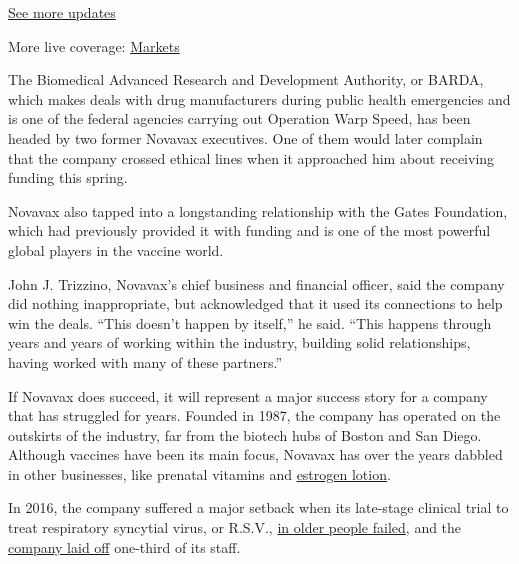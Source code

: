 \href{https://www.nytimes3xbfgragh.onion/2020/08/21/world/covid-19-coronavirus.html?action=click\&pgtype=Article\&state=default\&region=MAIN_CONTENT_1\&context=storylines_live_updates}{See
more updates}

More live coverage:
\href{https://www.nytimes3xbfgragh.onion/live/2020/08/20/business/stock-market-today-coronavirus?action=click\&pgtype=Article\&state=default\&region=MAIN_CONTENT_1\&context=storylines_live_updates}{Markets}

The Biomedical Advanced Research and Development Authority, or BARDA,
which makes deals with drug manufacturers during public health
emergencies and is one of the federal agencies carrying out Operation
Warp Speed, has been headed by two former Novavax executives. One of
them would later complain that the company crossed ethical lines when it
approached him about receiving funding this spring.

Novavax also tapped into a longstanding relationship with the Gates
Foundation, which had previously provided it with funding and is one of
the most powerful global players in the vaccine world.

John J. Trizzino, Novavax's chief business and financial officer, said
the company did nothing inappropriate, but acknowledged that it used its
connections to help win the deals. ``This doesn't happen by itself,'' he
said. ``This happens through years and years of working within the
industry, building solid relationships, having worked with many of these
partners.''

If Novavax does succeed, it will represent a major success story for a
company that has struggled for years. Founded in 1987, the company has
operated on the outskirts of the industry, far from the biotech hubs of
Boston and San Diego. Although vaccines have been its main focus,
Novavax has over the years dabbled in other businesses, like prenatal
vitamins and
\href{https://www.washingtonpost.com/archive/business/2003/10/11/novavaxs-estrogen-lotion-is-approved/53bc53d2-de8e-4c95-a1f0-8b05b3bcd6d0/}{estrogen
lotion}.

In 2016, the company suffered a major setback when its late-stage
clinical trial to treat respiratory syncytial virus, or R.S.V.,
\href{https://ir.novavax.com/news-releases/news-release-details/novavax-announces-topline-rsv-f-vaccine-data-two-clinical-trials}{in
older people failed}, and the
\href{https://endpts.com/crushed-by-a-phiii-flop-novavax-slashes-jobs-as-it-looks-to-chop-out-up-to-100m-in-costs/}{company
laid off} one-third of its staff.

